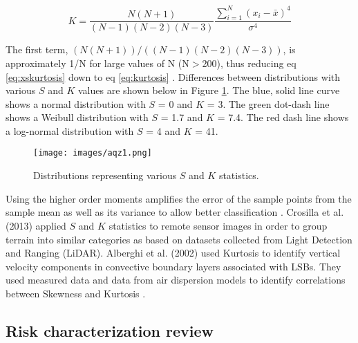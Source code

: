 \begin{equation}
\label{eq:xskurtosis}
K = \frac{N(N+1)}{(N-1)(N-2)(N-3)} \frac{\sum_{i=1}^{N}\left (x_{i}-\bar{x} \right )^{4}}{\sigma^{4}}
\end{equation}

The first term, $(N(N+1))/((N-1)(N-2)(N-3))$, is approximately 1/N for large values of N (N$>$200), thus reducing eq \ref{eq:xskurtosis} down to eq \ref{eq:kurtosis} \citep{Cox2010}.  Differences between distributions with various $S$ and $K$ values are shown below in Figure \ref{fig:SKcurves}.  The blue, solid line curve shows a normal distribution with $S$ = 0 and $K$ = 3. The green dot-dash line shows a Weibull distribution with $S$ = 1.7 and $K$ = 7.4.  The red dash line shows a log-normal distribution with $S$ = 4 and $K$ = 41. 
%
\begin{figure}
\texttt{[image: images/aqz1.png]} 
\caption{Distributions representing various $S$ and $K$ statistics.}
\label{fig:SKcurves}
\end{figure}
%
Using the higher order moments amplifies the error of the sample points from the sample mean as well as its variance to allow better classification \citep{Seo2011}.  Crosilla et al. (2013) applied $S$ and $K$ statistics to remote sensor images in order to group terrain into similar categories as based on datasets collected from Light Detection and Ranging (LiDAR).  Alberghi et al. (2002) used Kurtosis to identify vertical velocity components in convective boundary layers associated with LSBs.  They used measured data and data from air dispersion models to identify correlations between Skewness and Kurtosis \citep{Alberghi2002}.
\clearpage
\subsection{Risk characterization review}

